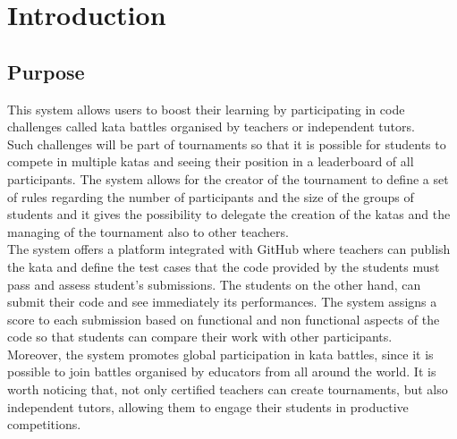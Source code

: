 \documentclass{article}
\begin{document}
\section{Introduction} 
    \subsection{Purpose}
        This system allows users to boost their learning by participating in
        code challenges called kata battles organised by teachers or independent tutors.\\

        Such challenges will be part of tournaments so that it is possible for students to compete in multiple katas and seeing their position in a leaderboard of all participants.
        The system allows for the creator of the tournament to define a set of rules regarding the number of participants and the size of the groups of students and it gives the possibility to delegate the creation of the katas and the managing of the tournament also to other teachers.\\

        The system offers a platform integrated with GitHub where teachers can publish the kata and define the test cases that the code provided by the students must pass and assess student's submissions.
        The students on the other hand, can submit their code and see immediately
        its performances. The system assigns a score to each submission
        based on functional and non functional aspects of the code so that
        students can compare their work with other participants.\\
        
        Moreover, the system promotes global participation in kata battles, since it is possible to join battles organised by educators from all around the world.
        It is worth noticing that, not only certified teachers can create tournaments, but also independent tutors, allowing them to engage their students in productive competitions. 
\end{document}
